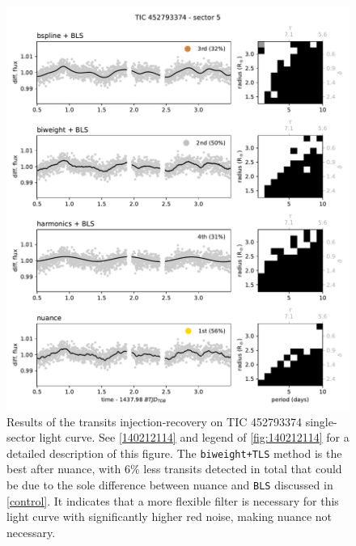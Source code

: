 \documentclass{aastex631}
\begin{document}
\begin{figure}[H]
    \begin{centering}
        \includegraphics[width=\linewidth]{452793374.pdf}
        \caption{Results of the transits injection-recovery on TIC 452793374 single-sector light curve. See \autoref{140212114} and legend of \autoref{fig:140212114} for a detailed description of this figure. The \texttt{biweight+TLS} method is the best after \textsf{nuance}, with 6\% less transits detected in total that could be due to the sole difference between \textsf{nuance} and \texttt{BLS} discussed in \autoref{control}. It indicates that a more flexible filter is necessary for this light curve with significantly higher red noise, making \textsf{nuance} not necessary.
        }
        \label{fig:452793374}
    \end{centering}
\end{figure}
\end{document}
